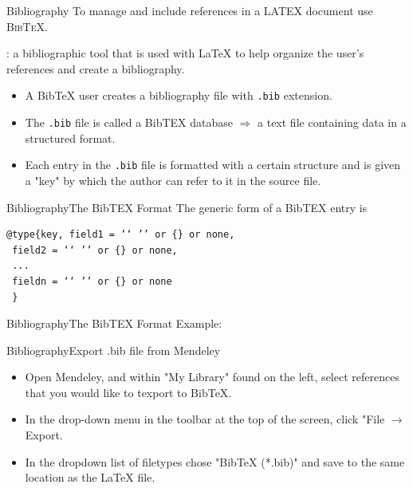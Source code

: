 \documentclass{beamer}
\begin{document}
\begin{darkframes}
\begin{frame}[<+->]{Bibliography}
To manage and include references in a LATEX document use \textsc{BibTeX}.\\
\begin{description}
	\item[BibTex]: a bibliographic tool that is used with LaTeX to help organize the user's references and create a bibliography.
	\begin{itemize}
		\item A BibTeX user creates a bibliography file with \texttt{.bib} extension.
		\item The \texttt{.bib} file is called a BibTEX database $\Rightarrow$ a text file containing data in a structured format.
		\item Each entry in the \texttt{.bib} file is formatted with a certain structure and is given a "key" by which the author can refer to it in the source file.
	\end{itemize}
\end{description}
\end{frame}

\begin{frame}[fragile]{Bibliography}{The BibTEX Format}
	The generic form of a BibTEX entry is
	\begin{center}
	\begin{verbatim}
@type{key, field1 = ‘‘ ’’ or {} or none,
 field2 = ‘‘ ’’ or {} or none, 
 ... 
 fieldn = ‘‘ ’’ or {} or none 
 }
	\end{verbatim}
\end{center}
\end{frame}

\begin{frame}[fragile]{Bibliography}{The BibTEX Format}
	\alert{Example:}
\end{frame}

\begin{frame}[<+->]{Bibliography}{Export .bib file from Mendeley}
\begin{itemize}
	\item Open Mendeley, and within "My Library" found on the left, select references that you would like to texport to BibTeX.
	\item In the drop-down menu in the toolbar at the top of the screen, click "File $\rightarrow$ Export.
	\item In the dropdown list of filetypes chose "BibTeX (*.bib)" and save to the same location as the LaTeX file.
\end{itemize}
 

\end{frame}
\end{darkframes}
\end{document}
